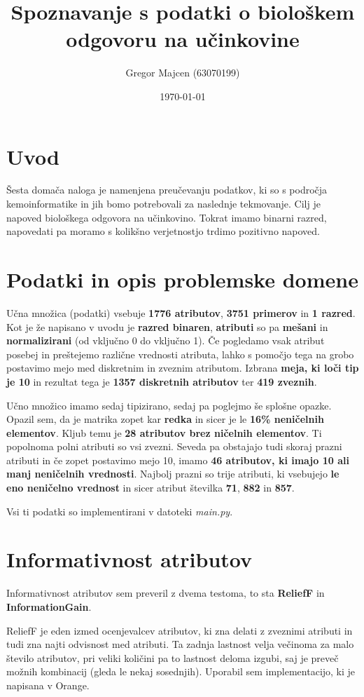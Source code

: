 \documentclass[a4paper,11pt]{article}
\title{Spoznavanje s podatki o biološkem odgovoru na učinkovine}
\author{Gregor Majcen (63070199)}
\date{\today}
\begin{document}
\maketitle

\section{Uvod}
Šesta domača naloga je namenjena preučevanju podatkov, ki so s področja kemoinformatike in jih bomo potrebovali za naslednje tekmovanje. Cilj je napoved biološkega odgovora na učinkovino. Tokrat imamo binarni razred, napovedati pa moramo s kolikšno verjetnostjo trdimo pozitivno napoved.

\section{Podatki in opis problemske domene}
Učna množica (podatki) vsebuje \textbf{1776 atributov}, \textbf{3751 primerov} in \textbf{1 razred}. Kot je že napisano v uvodu je \textbf{razred binaren}, \textbf{atributi} so pa \textbf{mešani} in \textbf{normalizirani} (od vključno 0 do vključno 1). Če pogledamo vsak atribut posebej in preštejemo različne vrednosti atributa, lahko s pomočjo tega na grobo postavimo mejo med diskretnim in zveznim atributom. Izbrana \textbf{meja, ki loči tip je 10} in rezultat tega je \textbf{1357 diskretnih atributov} ter \textbf{419 zveznih}. 

Učno množico imamo sedaj tipizirano, sedaj pa poglejmo še splošne opazke. Opazil sem, da je matrika zopet kar \textbf{redka} in sicer je le \textbf{16\% neničelnih elementov}. Kljub temu je \textbf{28 atributov brez ničelnih elementov}. Ti popolnoma polni atributi so vsi zvezni. Seveda pa obstajajo tudi skoraj prazni atributi in če zopet postavimo mejo 10, imamo \textbf{46 atributov, ki imajo 10 ali manj neničelnih vrednosti}. Najbolj prazni so trije atributi, ki vsebujejo \textbf{le eno neničelno vrednost} in sicer atribut številka \textbf{71}, \textbf{882} in \textbf{857}. 

Vsi ti podatki so implementirani v datoteki \textit{main.py}.

\section{Informativnost atributov}
Informativnost atributov sem preveril z dvema testoma, to sta \textbf{ReliefF} in \textbf{InformationGain}. 

ReliefF je eden izmed ocenjevalcev atributov, ki zna delati z zveznimi atributi in tudi zna najti odvisnost med atributi. Ta zadnja lastnost velja večinoma za malo število atributov, pri veliki količini pa to lastnost deloma izgubi, saj je preveč možnih kombinacij (gleda le nekaj sosednjih). Uporabil sem implementacijo, ki je napisana v Orange.
\end{document}
